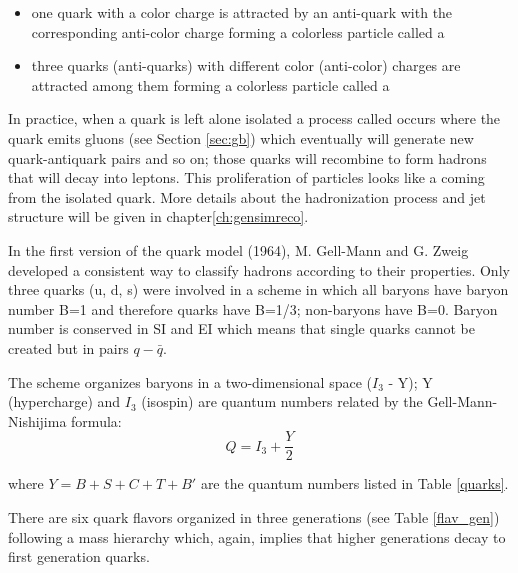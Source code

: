 \begin{itemize}
\item one quark with a color charge is attracted by an anti-quark with the corresponding anti-color charge forming a colorless particle called a 
\item three quarks (anti-quarks) with different color (anti-color) charges are attracted among them forming a colorless particle called a           
\end{itemize}

In practice, when a quark is left alone isolated a process called  occurs where the quark emits gluons (see Section \ref{sec:gb}) which eventually will generate new quark-antiquark pairs and so on; those quarks will recombine to form hadrons that will decay into leptons. This proliferation of particles looks like a  coming from the isolated quark. More details about the hadronization process and jet structure will be given in chapter\ref{ch:gensimreco}.         

In the first version of the quark model (1964), M. Gell-Mann\cite{gellman} and G. Zweig\cite{zweig,zweig2} developed a consistent way to classify hadrons according to their properties. Only three quarks (u, d, s) were involved in a scheme in which all baryons have baryon number B=1 and therefore quarks have B=1/3; non-baryons have B=0. Baryon number is conserved in SI and EI which means that single quarks cannot be created but in pairs $q-\bar{q}$.

The scheme organizes baryons in a two-dimensional space ($I_3$ - Y); Y (hypercharge) and $I_3$ (isospin) are quantum numbers related by the Gell-Mann-Nishijima formula\cite{gell_ni,gell_ni2}:
\begin{equation}
Q=I_3 + \frac{Y}{2}
\label{gmn}
\end{equation}

\noindent where $Y=B+S+C+T+B'$ are the quantum numbers listed in Table \ref{quarks}. 

There are six quark flavors organized in three generations (see Table \ref{flav_gen}) following a mass hierarchy which, again, implies that higher generations decay to first generation quarks.


